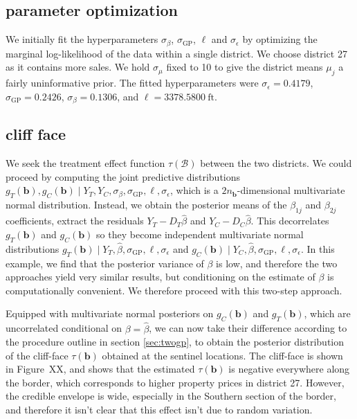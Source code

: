 \documentclass[letter]{article}
\newcommand{\sigmaf}{\sigma_{\mathrm{GP}}}
\newcommand{\sigman}{\sigma_{\epsilon}}
\newcommand{\boundary}{\mathcal{B}}
\newcommand{\sentinels}{\bm{b}}
\begin{document}
    	\subsection{parameter optimization}\label{parameter-optimization}

We initially fit the hyperparameters \(\sigma_\beta\), \(\sigmaf\), \(\ell\) and \(\sigman\) by optimizing the marginal log-likelihood of the data within a single district. We choose district 27 as it contains more sales. We hold \(\sigma_\mu\) fixed to 10 to give the district means \(\mu_j\) a fairly uninformative prior. The fitted hyperparameters were \(\sigman=0.4179\), \(\sigmaf=0.2426\), \(\sigma_\beta=0.1306\), and \(\ell=3378.5800~\text{ft}\).
    


    	\subsection{cliff face}\label{cliff-face}

We seek the treatment effect function \(\tau(\boundary)\) between the two districts. We could proceed by computing the joint predictive distributions \(g_T(\sentinels),g_C(\sentinels) \mid Y_T, Y_C, \sigma_\beta,\sigmaf,\ell,\sigman\), which is a \(2 n_{\sentinels}\)-dimensional multivariate normal distribution. Instead, we obtain the posterior means of the \(\beta_{1j}\) and \(\beta_{2j}\) coefficients, extract the residuals \(Y_T-D_T \hat{\beta}\) and \(Y_C-D_C \hat{\beta}\). This decorrelates \(g_T(\sentinels)\) and \(g_C(\sentinels)\) so they become independent multivariate normal distributions \(g_T(\sentinels) \mid Y_T, \hat\beta, \sigmaf,\ell,\sigman\) and \(g_C(\sentinels) \mid Y_C, \hat\beta, \sigmaf,\ell,\sigman\). In this example, we find that the posterior variance of \(\beta\) is low, and therefore the two approaches yield very similar results, but conditioning on the estimate of \(\beta\) is computationally convenient. We therefore proceed with this two-step approach.

Equipped with multivariate normal posteriors on \(g_C(\sentinels)\) and \(g_T(\sentinels)\), which are uncorrelated conditional on \(\beta=\hat\beta\), we can now take their difference according to the procedure outline in section \ref{sec:twogp}, to obtain the posterior distribution of the cliff-face \(\tau(\sentinels)\) obtained at the sentinel locations.
The cliff-face is shown in Figure~XX, and shows that the estimated \(\tau(\sentinels)\) is negative everywhere along the border, which corresponds to higher property prices in district 27.
However, the credible envelope is wide, especially in the Southern section of the border, and therefore it isn't clear that this effect isn't due to random variation.
\end{document}
